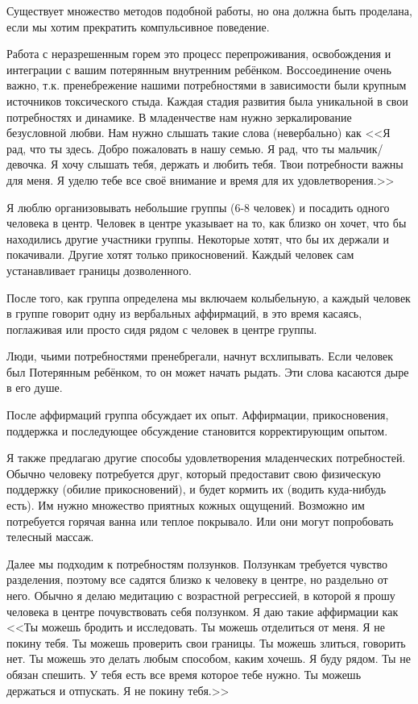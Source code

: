 \documentclass[10pt, fleqn]{article}
\begin{document}
Существует множество методов подобной работы, но она должна быть проделана, если мы хотим прекратить компульсивное поведение.


Работа с неразрешенным горем это процесс перепроживания, освобождения и интеграции с вашим потерянным внутренним ребёнком.
Воссоединение очень важно, т.к. пренебрежение нашими потребностями в зависимости были крупным источников токсического стыда. Каждая стадия развития была уникальной в свои потребностях и динамике. В младенчестве нам нужно зеркалирование безусловной любви. Нам нужно слышать такие слова (невербально) как <<Я рад, что ты здесь. Добро пожаловать в нашу семью. Я рад, что ты мальчик/девочка. Я хочу слышать тебя, держать и любить тебя. Твои потребности важны для меня. Я уделю тебе все своё внимание и время для их удовлетворения.>>

Я люблю организовывать небольшие группы (6-8 человек) и посадить одного человека в центр. Человек в центре указывает на то, как близко он хочет, что бы находились другие участники группы. Некоторые хотят, что бы их держали и покачивали. Другие хотят только прикосновений. Каждый человек сам устанавливает границы дозволенного.

После того, как группа определена мы включаем колыбельную, а каждый человек в группе говорит одну из вербальных аффирмаций, в это время касаясь, поглаживая или просто сидя рядом с человек в центре группы.

Люди, чьими потребностями пренебрегали, начнут всхлипывать. Если человек был Потерянным ребёнком, то он может начать рыдать. Эти слова касаются дыре в его душе.

После аффирмаций группа обсуждает их опыт. Аффирмации, прикосновения, поддержка и последующее обсуждение становится корректирующим опытом.

Я также предлагаю другие способы удовлетворения младенческих потребностей. Обычно человеку потребуется друг, который предоставит свою физическую поддержку (обилие прикосновений), и будет кормить их (водить куда-нибудь есть). Им нужно множество приятных кожных ощущений. Возможно им потребуется горячая ванна или теплое покрывало. Или они могут попробовать телесный массаж.

Далее мы подходим к потребностям ползунков. Ползункам требуется чувство разделения, поэтому все садятся близко к человеку в центре, но раздельно от него. Обычно я делаю медитацию с возрастной регрессией, в которой я прошу человека в центре почувствовать себя ползунком. Я даю такие аффирмации как <<Ты можешь бродить и исследовать. Ты можешь отделиться от меня. Я не покину тебя. Ты можешь проверить свои границы. Ты можешь злиться, говорить нет. Ты можешь это делать любым способом, каким хочешь. Я буду рядом. Ты не обязан спешить. У тебя есть все время которое тебе нужно. Ты можешь держаться и отпускать. Я не покину тебя.>>
\end{document}
